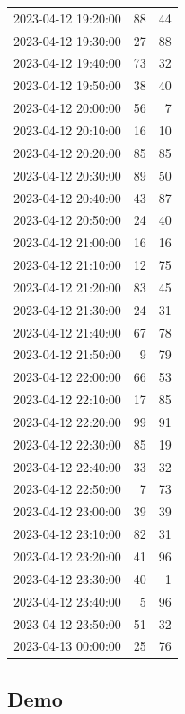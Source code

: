 \documentclass[
  letterpaper,
  DIV=11,
  numbers=noendperiod]{scrartcl}
\begin{document}
\begin{tabular}{lrr}
2023-04-12 19:20:00 &    88 &    44 \\
2023-04-12 19:30:00 &    27 &    88 \\
2023-04-12 19:40:00 &    73 &    32 \\
2023-04-12 19:50:00 &    38 &    40 \\
2023-04-12 20:00:00 &    56 &     7 \\
2023-04-12 20:10:00 &    16 &    10 \\
2023-04-12 20:20:00 &    85 &    85 \\
2023-04-12 20:30:00 &    89 &    50 \\
2023-04-12 20:40:00 &    43 &    87 \\
2023-04-12 20:50:00 &    24 &    40 \\
2023-04-12 21:00:00 &    16 &    16 \\
2023-04-12 21:10:00 &    12 &    75 \\
2023-04-12 21:20:00 &    83 &    45 \\
2023-04-12 21:30:00 &    24 &    31 \\
2023-04-12 21:40:00 &    67 &    78 \\
2023-04-12 21:50:00 &     9 &    79 \\
2023-04-12 22:00:00 &    66 &    53 \\
2023-04-12 22:10:00 &    17 &    85 \\
2023-04-12 22:20:00 &    99 &    91 \\
2023-04-12 22:30:00 &    85 &    19 \\
2023-04-12 22:40:00 &    33 &    32 \\
2023-04-12 22:50:00 &     7 &    73 \\
2023-04-12 23:00:00 &    39 &    39 \\
2023-04-12 23:10:00 &    82 &    31 \\
2023-04-12 23:20:00 &    41 &    96 \\
2023-04-12 23:30:00 &    40 &     1 \\
2023-04-12 23:40:00 &     5 &    96 \\
2023-04-12 23:50:00 &    51 &    32 \\
2023-04-13 00:00:00 &    25 &    76 \\
\bottomrule
\end{tabular}

\hypertarget{demo}{%
\subsection{Demo}\label{demo}}
\end{document}
